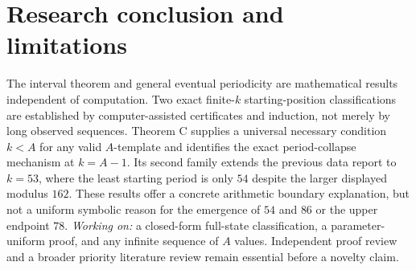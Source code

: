 \documentclass[11pt]{article}
\begin{document}
\section{Research conclusion and limitations}
The interval theorem and general eventual periodicity are mathematical results independent of computation. Two exact finite-$k$ starting-position classifications are established by computer-assisted certificates and induction, not merely by long observed sequences. Theorem C supplies a universal necessary condition $k<A$ for any valid $A$-template and identifies the exact period-collapse mechanism at $k=A-1$. Its second family extends the previous data report to $k=53$, where the least starting period is only $54$ despite the larger displayed modulus $162$. These results offer a concrete arithmetic boundary explanation, but not a uniform symbolic reason for the emergence of $54$ and $86$ or the upper endpoint $78$. \emph{Working on:} a closed-form full-state classification, a parameter-uniform proof, and any infinite sequence of $A$ values. Independent proof review and a broader priority literature review remain essential before a novelty claim.

\end{document}
